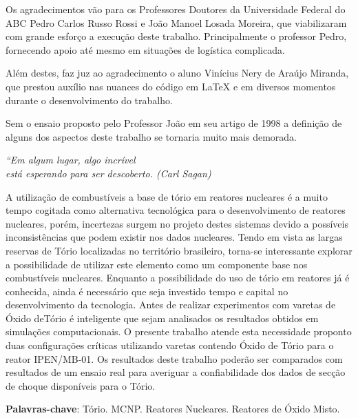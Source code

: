 \documentclass[
	12pt,				%
	openany,			%
	twoside,			%
	a4paper,			%
	english,			%
	french,				%
	spanish,			%
	brazil				%
	]{abntex2}
\begin{document}
\begin{agradecimentos}

Os agradecimentos vão para os Professores Doutores da Universidade Federal do ABC Pedro Carlos Russo Rossi e João Manoel Losada Moreira, que viabilizaram com grande esforço a execução deste trabalho. Principalmente o professor Pedro, fornecendo apoio até mesmo em situações de logística complicada. 

Além destes, faz juz ao agradecimento o aluno Vinícius Nery de Araújo Miranda, que prestou auxílio nas nuances do código em LaTeX e em diversos momentos durante o desenvolvimento do trabalho.

Sem o ensaio proposto pelo Professor João em seu artigo de 1998 a definição de alguns dos aspectos deste trabalho se tornaria muito mais demorada.

\end{agradecimentos}

\begin{epigrafe}
    \vspace*{\fill}
	\begin{flushright}
		\textit{``Em algum lugar, algo incrível \\ está esperando para ser descoberto.
		(Carl Sagan)}
	\end{flushright}
\end{epigrafe}


\setlength{\absparsep}{18pt} %
\begin{resumo}
A utilização de combustíveis a base de tório em reatores nucleares é a muito tempo cogitada como alternativa tecnológica para o desenvolvimento de reatores nucleares, porém, incertezas surgem no projeto destes sistemas devido a possíveis inconsistências que podem existir nos dados nucleares. Tendo em vista as largas reservas de Tório localizadas no território brasileiro, torna-se interessante explorar a possibilidade de utilizar este elemento como um componente base nos combustíveis nucleares. Enquanto a possibilidade do uso de tório em reatores já é conhecida, ainda é necessário que seja investido tempo e capital no desenvolvimento da tecnologia. Antes de realizar experimentos com varetas de Óxido deTório é inteligente que sejam analisados os resultados obtidos em simulações computacionais. O presente trabalho atende esta necessidade proponto duas configurações críticas utilizando varetas contendo Óxido de Tório para o reator IPEN/MB-01. Os resultados deste trabalho poderão ser comparados com resultados de um ensaio real para averiguar a confiabilidade dos dados de secção de choque disponíveis para o Tório. 

 \textbf{Palavras-chave}: Tório. MCNP. Reatores Nucleares. Reatores de Óxido Misto.
\end{resumo}
\end{document}
